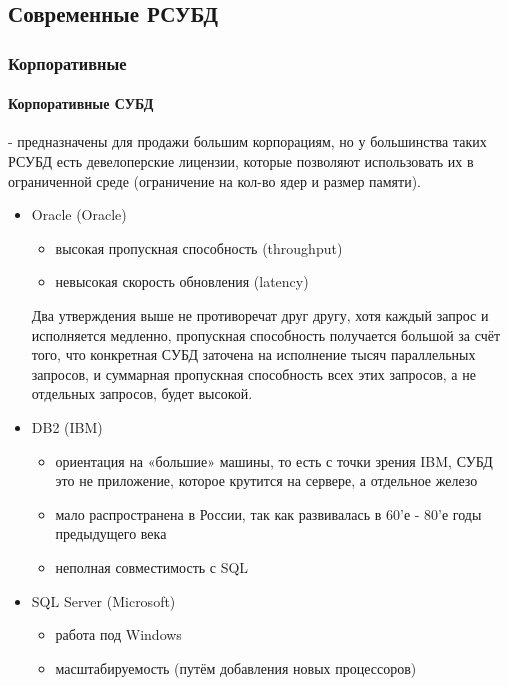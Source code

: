\subsection{Современные РСУБД}
\subsubsection{Корпоративные}

\paragraph{Корпоративные СУБД} - предназначены для продажи большим корпорациям, но у большинства таких РСУБД есть
девелоперские лицензии, которые позволяют использовать их в ограниченной среде (ограничение на кол-во ядер и размер памяти).

\begin{itemize}
    \item Oracle (Oracle)
    \begin{itemize}
        \item высокая пропускная способность (throughput)
        \item невысокая скорость обновления (latency)
    \end{itemize}
    \begin{remark}
         Два утверждения выше не противоречат друг другу, хотя каждый запрос и исполняется медленно, пропускная способность получается большой за счёт того, что конкретная СУБД заточена на исполнение тысяч параллельных запросов, и суммарная пропускная способность всех этих запросов, а не отдельных запросов, будет высокой.
    \end{remark}
    \item DB2 (IBM)
    \begin{itemize}
        \item ориентация на «большие» машины, то есть с точки зрения IBM, СУБД это не приложение, которое крутится на сервере, а отдельное железо
        \item мало распространена в России, так как развивалась в 60'е - 80'е годы предыдущего века
        \item неполная совместимость с SQL
    \end{itemize}
    \item SQL Server (Microsoft)
    \begin{itemize}
        \item работа под Windows
        \item масштабируемость (путём добавления новых процессоров)
    \end{itemize}
\end{itemize}

